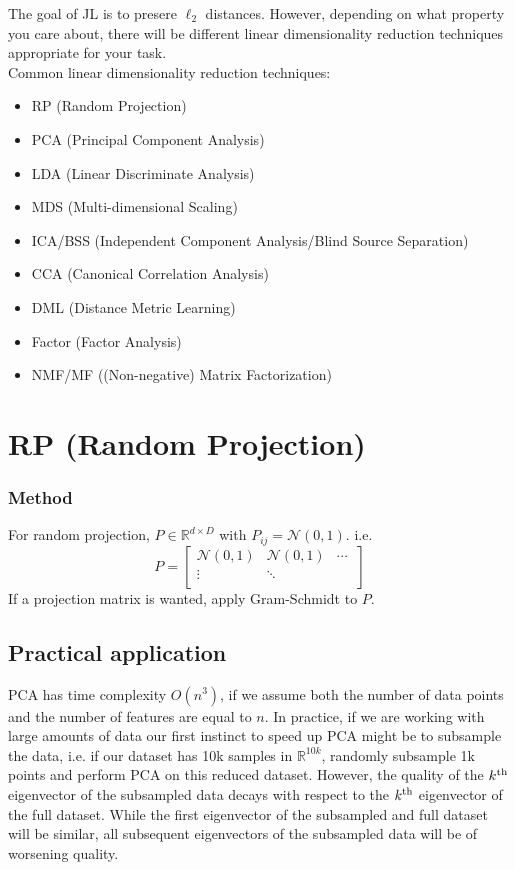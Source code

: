 The goal of JL is to presere $\ell_{2}$ distances. However, depending
on what property you care about, there will be different linear
dimensionality reduction techniques appropriate for your task. \\ 

\noindent Common linear dimensionality reduction techniques:
\begin{itemize}
\item RP (Random Projection)
\item PCA (Principal Component Analysis)
\item LDA (Linear Discriminate Analysis)
\item MDS (Multi-dimensional Scaling)
\item ICA/BSS (Independent Component Analysis/Blind Source Separation)
\item CCA (Canonical Correlation Analysis)
\item DML (Distance Metric Learning)
\item Factor (Factor Analysis)
\item NMF/MF ((Non-negative) Matrix Factorization)
\end{itemize}

\section{RP (Random Projection)}
\subsubsection*{Method}
For random projection, $P\in \mathbb{R}^{d\times D}$ with $P_{ij} =
\mathcal{N}(0,1)$. i.e. 
\[
P = 
\begin{bmatrix}
    \mathcal{N}(0,1) & \mathcal{N}(0,1) & \dotsm\ \\
    \vdots & \ddots & \\
\end{bmatrix}
\]
If a projection matrix is wanted, apply Gram-Schmidt to $P$.

\subsection{Practical application}
PCA has time complexity $O(n^3)$, if we assume both the number of data
points and the number of features are equal to $n$. In practice, if we
are working with large amounts of data our first instinct to speed up
PCA might be to subsample the data, i.e. if our dataset has 10k
samples in $\mathbb{R}^{10k}$, randomly subsample 1k points and
perform PCA on this reduced dataset. However, the quality of the
$k^{\rm th}$ eigenvector of the subsampled data decays with respect to
the $k^{\rm th}$ eigenvector of the full dataset. While the first
eigenvector of the subsampled and full dataset will be similar, all
subsequent eigenvectors of the subsampled data will be of worsening
quality.  

